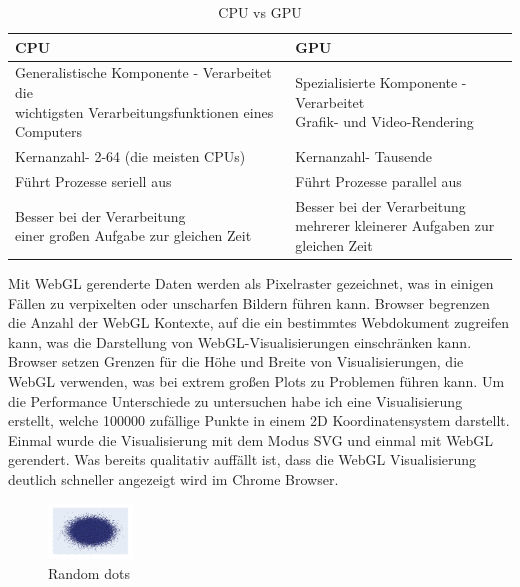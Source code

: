 \documentclass{article}
\begin{document}
\begin{table}[!h]
\centering
\begin{tabular}{|l|l|}
\hline
\textbf{CPU} & \textbf{GPU} \\
\hline
\makecell[l]{Generalistische Komponente - Verarbeitet die \\ wichtigsten Verarbeitungsfunktionen eines Computers}& \makecell[l]{Spezialisierte Komponente - Verarbeitet \\Grafik- und Video-Rendering} \\
\hline
Kernanzahl- 2-64 (die meisten CPUs)&Kernanzahl- Tausende \\
\hline
Führt Prozesse seriell aus & Führt Prozesse parallel aus\\
\hline
\makecell[l]{Besser bei der Verarbeitung\\ einer großen Aufgabe zur gleichen Zeit} & \makecell[l]{Besser bei der Verarbeitung \\mehrerer kleinerer Aufgaben zur gleichen Zeit} \\
\hline
\end{tabular}
\caption{\label{tab: LE1 CPU vs GPU}CPU vs GPU}
\end{table}
    
\noindent
Mit WebGL gerenderte Daten werden als Pixelraster gezeichnet, was in einigen Fällen zu verpixelten oder unscharfen Bildern führen kann.
Browser begrenzen die Anzahl der WebGL Kontexte, auf die ein bestimmtes Webdokument zugreifen kann, was die Darstellung von WebGL-Visualisierungen einschränken kann.
Browser setzen Grenzen für die Höhe und Breite von Visualisierungen, die WebGL verwenden, was bei extrem großen Plots zu Problemen führen kann.\cite{plotly_webgl_nodate}
\newline
\newline
Um die Performance Unterschiede zu untersuchen habe ich eine Visualisierung erstellt, welche 100000 zufällige Punkte in einem 2D Koordinatensystem darstellt.
Einmal wurde die Visualisierung mit dem Modus SVG und einmal mit WebGL gerendert. Was bereits qualitativ auffällt ist, dass die WebGL Visualisierung deutlich schneller angezeigt wird im Chrome Browser.

\begin{figure}[!h]
\centering
\includegraphics[width=0.2\textwidth]{img/random_dots.png}


\caption{\label{fig: LE1 Random Dots plot}Random dots}
\end{figure}
\end{document}
